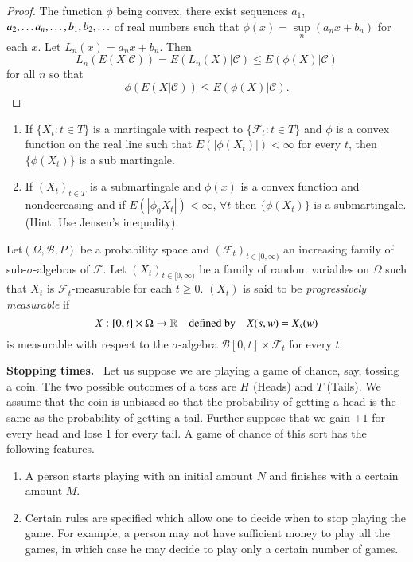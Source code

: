 \begin{proof}
The function $\phi$ being convex, there exist sequences $a_{1}$,
$a_{2},\ldots a_{n},\break \ldots,b_{1},b_{2},\ldots$ of real numbers such
that $\phi(x)=\sup\limits_{n}(a_{n}x+b_{n})$ for each $x$. Let
$L_{n}(x)=a_{n}x+b_{n}$. Then 
$$
L_{n}(E(X|\mathscr{C}))=E(L_{n}(X)|\mathscr{C})\leq E(\phi(X)|\mathscr{C})
$$
for all $n$ so that
$$
\phi (E(X|\mathscr{C}))\leq E(\phi(X)|\mathscr{C}).
$$
\end{proof}

\begin{exer*}
\begin{enumerate}
\renewcommand{\theenumi}{\alph{enumi}}
\renewcommand{\labelenumi}{(\theenumi)}
\item If $\{X_{t}:t\in T\}$ is a martingale with respect to
  $\{\mathscr{F}_{t}:t\in T\}$ and $\phi$ is a convex function on the
  real line such that $E(|\phi(X_{t})|)<\infty$ for every $t$, then
  $\{\phi(X_{t})\}$ is a sub martingale.

\item If $(X_{t})_{t\in T}$ is a submartingale and $\phi(x)$ is a
  convex function and nondecreasing and if
  $E(|\phi_{0}X_{t}|)<\infty$, $\forall t$ then $\{\phi(X_{t})\}$ is a
  submartingale. (Hint: Use Jensen's inequality).
\end{enumerate}
\end{exer*}

\begin{defi*}
Let\pageoriginale $(\Omega,\mathscr{B},P)$ be a probability space and
$(\mathscr{F}_{t})_{t\in [0,\infty)}$ an increasing family of
  sub-$\sigma$-algebras of $\mathscr{F}$. Let $(X_{t})_{t\in
    [0,\infty)}$ be a family of random variables on $\Omega$ such that
    $X_{t}$ is $\mathscr{F}_{t}$-measurable for each $t\geq
    0$. $(X_{t})$ is said to be {\em progressively measurable} if
$$
X:[0,t]\times \Omega\to \mathbb{R}\quad \text{defined by}\quad
X(s,w)=X_{s}(w)
$$
is measurable with respect to the $\sigma$-algebra
$\mathscr{B}[0,t]\times \mathscr{F}_{t}$ for every $t$.
\end{defi*}

\noindent
{\bf Stopping times.}~ Let us suppose we are playing a game of chance,
say, tossing a coin. The two possible outcomes of a toss are $H$
(Heads) and $T$ (Tails). We assume that the coin is unbiased so that
the probability of getting a head is the same as the probability of
getting a tail. Further suppose that we gain $+1$ for every head and
lose 1 for every tail. A game of chance of this sort has the following
features. 
\begin{enumerate}
\item A person starts playing with an initial amount $N$ and finishes
  with a certain amount $M$.

\item Certain rules are specified which allow one to decide when to
  stop playing the game. For example, a person may not have sufficient
  money to play all the games, in which case he may decide to play
  only a certain number of games.
\end{enumerate}

